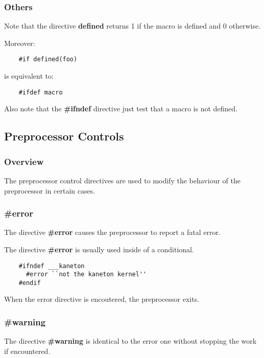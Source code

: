 \documentclass[9pt]{beamer}
\newcommand{\nl}[0]{\vspace{0.4cm}}
\begin{document}

\begin{frame}[containsverbatim]
  \frametitle{Others}

  Note that the directive \textbf{defined} returns 1 if the macro is
  defined and 0 otherwise.

  Moreover:

  \begin{verbatim}
    #if defined(foo)
  \end{verbatim}

  is equivalent to:

  \begin{verbatim}
    #ifdef macro
  \end{verbatim}

  Also note that the \textbf{\#ifndef} directive just test that a macro
  is not defined.
\end{frame}

%
%

\subsection{Preprocessor Controls}


\begin{frame}
  \frametitle{Overview}

  The preprocessor control directives are used to modify the behaviour
  of the preprocessor in certain cases.
\end{frame}


\begin{frame}[containsverbatim]
  \frametitle{\textbf{\#error}}

  The directive \textbf{\#error} causes the preprocessor to report a
  fatal error.

  \nl

  The directive \textbf{\#error} is usually used inside of a conditional.

  \begin{verbatim}
    #ifndef ___kaneton
      #error ``not the kaneton kernel''
    #endif
  \end{verbatim}

  When the error directive is encoutered, the preprocessor exits.
\end{frame}


\begin{frame}
  \frametitle{\textbf{\#warning}}

    The directive \textbf{\#warning} is identical to the error one
    without stopping the work if encountered.
\end{frame}
\end{document}
